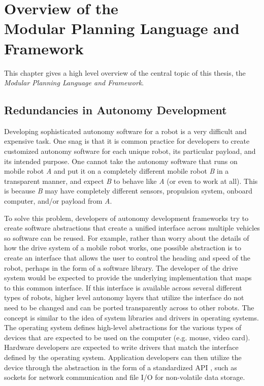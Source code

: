\chapter{Overview of the \\Modular Planning Language and Framework}
This chapter gives a high level overview of the central topic of this thesis, the \textit{Modular Planning Language and Framework}.

\section{Redundancies in Autonomy Development}
Developing sophisticated autonomy software for a robot is a very difficult and expensive task. One snag is that it is common practice for developers to create customized autonomy software for each unique robot, its particular payload, and its intended purpose. One cannot take the autonomy software that runs on mobile robot \textit{A} and put it on a completely different mobile robot \textit{B} in a transparent manner, and expect \textit{B} to behave like \textit{A} (or even to work at all). This is because \textit{B} may have completely different sensors, propulsion system, onboard computer, and/or payload from \textit{A}. 

To solve this problem, developers of autonomy development frameworks try to create software abstractions that create a unified interface across multiple vehicles so software can be reused. For example, rather than worry about the details of how the drive system of a mobile robot works, one possible abstraction is to create an interface that allows the user to control the heading and speed of the robot, perhaps in the form of a software library. The developer of the drive system would be expected to provide the underlying implementation that maps to this common interface. If this interface is available across several different types of robots, higher level autonomy layers that utilize the interface do not need to be changed and can be ported transparently across to other robots. The concept is similar to the idea of system libraries and drivers in operating systems. The operating system defines high-level abstractions for the various types of devices that are expected to be used on the computer (e.g. mouse, video card). Hardware developers are expected to write drivers that match the interface defined by the operating system. Application developers can then utilize the device through the abstraction in the form of a standardized API , such as sockets for network communication and file I/O for non-volatile data storage. 

